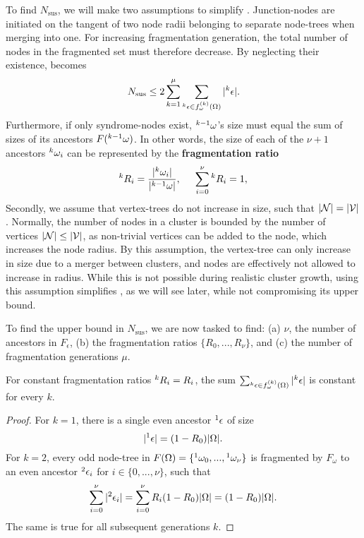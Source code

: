 To find $N_{\text{sus}}$, we will make two assumptions to simplify . Junction-nodes are initiated on the tangent of two node radii belonging to separate node-trees when merging into one. For increasing fragmentation generation, the total number of nodes in the fragmented set must therefore decrease. By neglecting their existence,  becomes
\begin{equation}\label{eq:npdc2}
  N_{\text{sus}} \leq 2\sum_{k=1}^\mu{ \sum_{  {}^{k} \epsilon \in f_\omega^{(k)}(\Omega) }{ \lvert {}^{k} \epsilon\rvert} }.
\end{equation}
Furthermore, if only syndrome-nodes exist, ${}^{k-1}\omega$'s size must equal the sum of sizes of its ancestors $F({}^{k-1}\omega)$. In other words, the size of each of the $\nu+1$ ancestors ${}^{k}\omega_i$ can be represented by the \textbf{fragmentation ratio}
\begin{equation}\label{eq:ratio}
  {}^{k}R_i = \frac{\lvert{}^{k}\omega_i\rvert}{\lvert{}^{k-1}\omega\rvert}, \hspace{0.5cm} \sum_{i=0}^{\nu}{{}^{k}R_i} = 1,
\end{equation}
Secondly, we assume that vertex-trees do not increase in size, such that $\lvert\mathcal{N}\rvert=\lvert\mathcal{V}\rvert$. Normally, the number of nodes in a cluster is bounded by the number of vertices $\lvert\mathcal{N}\rvert\leq \lvert\mathcal{V}\rvert$, as non-trivial vertices can be added to the node, which increases the node radius. By this assumption, the vertex-tree can only increase in size due to a merger between clusters, and nodes are effectively not allowed to increase in radius. While this is not possible during realistic cluster growth, using this assumption simplifies , as we will see later, while not compromising its upper bound. 

To find the upper bound in $N_{\text{sus}}$, we are now tasked to find: (a) $\nu$, the number of ancestors in $F_\epsilon$, (b) the fragmentation ratios $\{R_0, ..., R_\nu\}$, and (c) the number of fragmentation generations $\mu$. 

\begin{lemma}\label{lem:evenconstant}
  For constant fragmentation ratios ${}^{k}R_i = R_i$, the sum $\sum_{ {}^{k}\epsilon \in f_\omega^{(k)}(\Omega) }{ \lvert{}^{k}\epsilon\rvert}$ is constant for every $k$. 
\end{lemma}
\begin{proof}
  For $k=1$, there is a single even ancestor ${}^{1}\epsilon$ of size 
  \begin{equation*}
    \lvert{}^{1}\epsilon\rvert = (1 - R_0)\lvert\Omega\rvert.
  \end{equation*}
  For $k=2$, every odd node-tree in $F(\Omega)=\{{}^{1}\omega_0,...,{}^{1}\omega_\nu\}$ is fragmented by $F_\omega$ to an even ancestor ${}^{2}\epsilon_i$ for $i \in \{0,...,\nu \}$, such that 
  \begin{equation*}
    \sum_{i=0}^{\nu}{\lvert{}^{2}\epsilon_i\rvert}  = \sum_{i=0}^{\nu}{R_i(1 - R_0)\lvert\Omega\rvert}= (1 - R_0)\lvert\Omega\rvert.
  \end{equation*}
  The same is true for all subsequent generations $k$. 
\end{proof}

